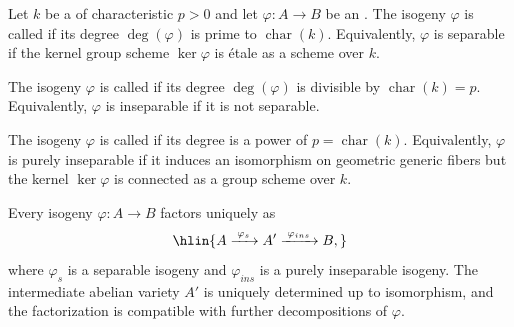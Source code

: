 \begin{definition} \label{definition:separable_and_purely_inseparable_isogeny_of_abelian_varieties}
    Let $k$ be a  of characteristic $p > 0$ and let $\varphi\colon A \to B$ be an . 
    The isogeny $\varphi$ is called  if its degree $\deg(\varphi)$ is prime to $\operatorname{char}(k)$. Equivalently, $\varphi$ is separable if the kernel group scheme $\ker \varphi$ is étale as a scheme over $k$.

    The isogeny $\varphi$ is called  if its degree $\deg(\varphi)$ is divisible by $\operatorname{char}(k) = p$. Equivalently, $\varphi$ is inseparable if it is not separable.

    The isogeny $\varphi$ is called  if its degree is a power of $p = \operatorname{char}(k)$. Equivalently, $\varphi$ is purely inseparable if it induces an isomorphism on geometric generic fibers but the kernel $\ker \varphi$ is connected as a group scheme over $k$.

    Every isogeny $\varphi\colon A \to B$ factors uniquely as
    $$\hlin{A \xrightarrow{\;\varphi_s\;} A' \xrightarrow{\;\varphi_{ins}\;} B,}$$
    where $\varphi_s$ is a separable isogeny and $\varphi_{ins}$ is a purely inseparable isogeny. The intermediate abelian variety $A'$ is uniquely determined up to isomorphism, and the factorization is compatible with further decompositions of $\varphi$.
\end{definition}
